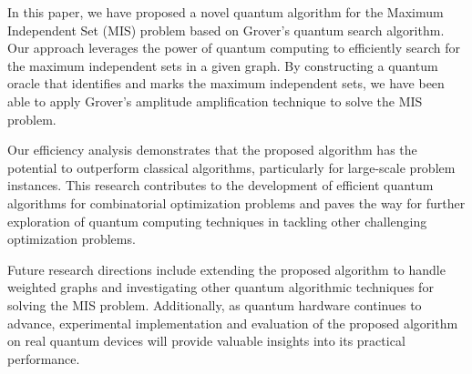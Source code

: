 In this paper, we have proposed a novel quantum algorithm for the Maximum Independent Set (MIS) problem based on Grover's quantum search algorithm. Our approach leverages the power of quantum computing to efficiently search for the maximum independent sets in a given graph. By constructing a quantum oracle that identifies and marks the maximum independent sets, we have been able to apply Grover's amplitude amplification technique to solve the MIS problem.

Our efficiency analysis demonstrates that the proposed algorithm has the potential to outperform classical algorithms, particularly for large-scale problem instances. This research contributes to the development of efficient quantum algorithms for combinatorial optimization problems and paves the way for further exploration of quantum computing techniques in tackling other challenging optimization problems.

Future research directions include extending the proposed algorithm to handle weighted graphs and investigating other quantum algorithmic techniques for solving the MIS problem. Additionally, as quantum hardware continues to advance, experimental implementation and evaluation of the proposed algorithm on real quantum devices will provide valuable insights into its practical performance.

